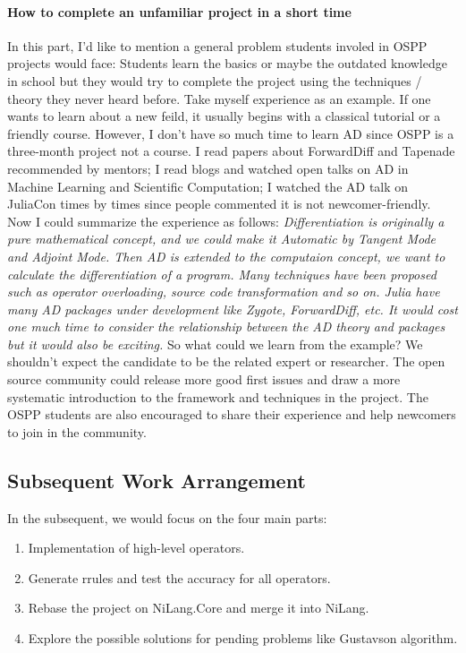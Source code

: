 \paragraph{How to complete an unfamiliar project in a short time} In this part, I'd like to mention a general problem students
involed in OSPP projects would face: Students learn the basics or maybe the outdated knowledge in school but they would try to complete 
the project using the techniques / theory they never heard before. Take myself experience as an example. If one wants to learn about a new feild, it usually begins with 
a classical tutorial or a friendly course. However, I don't have so much time to learn AD since OSPP
is a three-month project not a course. I read papers about ForwardDiff and Tapenade recommended by mentors;
I read blogs and watched open talks on AD in Machine Learning and Scientific Computation; I watched the AD talk 
on JuliaCon times by times since people commented it is not newcomer-friendly. Now I could summarize the experience 
as follows: \textit{Differentiation is originally a pure mathematical concept, and we could make it Automatic by 
Tangent Mode and Adjoint Mode. Then AD is extended to the computaion concept, we want to calculate the differentiation of 
a program. Many techniques have been proposed such as operator overloading, source code transformation and so on. 
Julia have many AD packages under development like Zygote, ForwardDiff, etc. It would cost one much time to 
consider the relationship between the AD theory and packages but it would also be exciting.} 
So what could we learn from the example? We shouldn't expect the candidate to be the related
expert or researcher. The open source community could release more good first issues and draw a 
more systematic introduction to the framework and techniques in the project. The OSPP students are also encouraged to share their 
experience and help newcomers to join in the community.   

\subsection{Subsequent Work Arrangement}
In the subsequent, we would focus on the four main parts:
\begin{enumerate}[(1)]
    \item Implementation of high-level operators.
    \item Generate rrules and test the accuracy for all operators.
    \item Rebase the project on NiLang.Core and merge it into NiLang.
    \item Explore the possible solutions for pending problems like Gustavson algorithm.
\end{enumerate}

